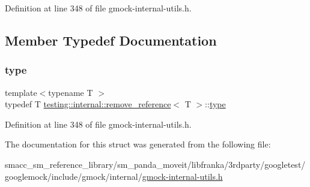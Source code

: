 Definition at line 348 of file gmock-\/internal-\/utils.\+h.



\subsection{Member Typedef Documentation}
\mbox{\label{structtesting_1_1internal_1_1remove__reference_a291edca52c59a0d211977d4802439b8a}} 
\subsubsection{\texorpdfstring{type}{type}}
{\footnotesize\ttfamily template$<$typename T $>$ \\
typedef T \hyperlink{structtesting_1_1internal_1_1remove__reference}{testing\+::internal\+::remove\+\_\+reference}$<$ T $>$\+::\hyperlink{structtesting_1_1internal_1_1remove__reference_a291edca52c59a0d211977d4802439b8a}{type}}



Definition at line 348 of file gmock-\/internal-\/utils.\+h.



The documentation for this struct was generated from the following file\+:\begin{DoxyCompactItemize}
\item 
smacc\+\_\+sm\+\_\+reference\+\_\+library/sm\+\_\+panda\+\_\+moveit/libfranka/3rdparty/googletest/googlemock/include/gmock/internal/\hyperlink{gmock-internal-utils_8h}{gmock-\/internal-\/utils.\+h}\end{DoxyCompactItemize}
